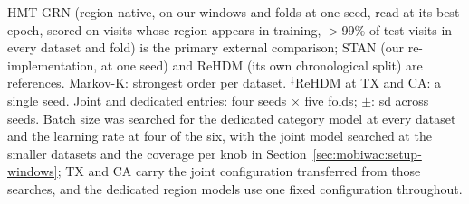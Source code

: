 \begin{table}[htbp]
\vspace{2pt}
{\footnotesize HMT-GRN (region-native, on our windows and folds at one seed, read at its best epoch, scored on visits whose region appears in training, $>$99\% of test visits in every dataset
and fold) is the primary external comparison; STAN (our re-implementation, at one seed) and ReHDM (its own chronological split)
are references. Markov-K: strongest order per dataset. $^{\ddagger}$ReHDM at TX and CA: a single seed. Joint and dedicated entries: four seeds
$\times$ five folds; $\pm$: sd across seeds. Batch size was searched for the dedicated
category model at every dataset and the learning rate at four of the six, with the joint model
searched at the smaller datasets and the coverage per knob in
Section~\ref{sec:mobiwac:setup-windows}; TX and CA
carry the joint configuration transferred from those searches, and the dedicated region models use one
fixed configuration throughout.}
\end{table}
